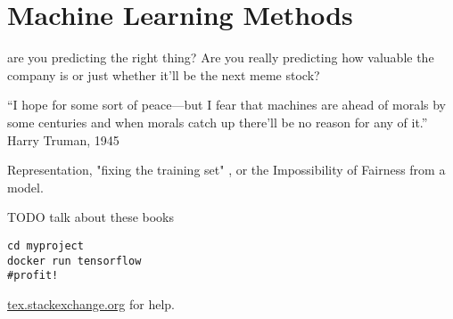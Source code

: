 \setchapterpreamble[u]{\margintoc}
\chapter{Machine Learning Methods}


are you predicting the right thing? Are you really predicting how valuable the company is or just whether it'll be the next meme stock?

“I hope for some sort of peace—but I fear that machines are ahead of morals by some centuries and when morals catch up there'll be no reason for any of it.” Harry Truman, 1945 

Representation, "fixing the training set" , or the Impossibility of Fairness from a model.

TODO talk about these books
\cite{Oneil2017}
\cite{Perez2019}
\cite{Blackman2022Jul}
\cite{Christian2020}


\begin{lstlisting}[style=kaolstplain,linewidth=1.5\textwidth]
cd myproject
docker run tensorflow
#profit!
\end{lstlisting}

\url{tex.stackexchange.org} for help.


